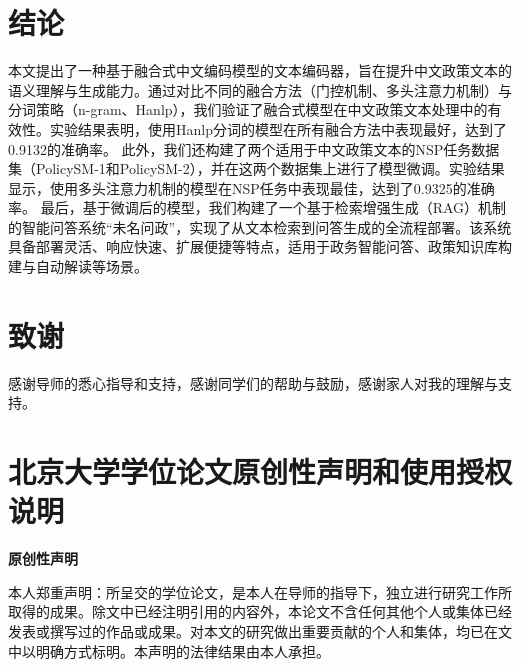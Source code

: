 \documentclass[12pt, a4paper]{ctexart}
\begin{document}
\section{结论}
本文提出了一种基于融合式中文编码模型的文本编码器，旨在提升中文政策文本的语义理解与生成能力。通过对比不同的融合方法（门控机制、多头注意力机制）与分词策略（n-gram、Hanlp），我们验证了融合式模型在中文政策文本处理中的有效性。实验结果表明，使用Hanlp分词的模型在所有融合方法中表现最好，达到了0.9132的准确率。
此外，我们还构建了两个适用于中文政策文本的NSP任务数据集（PolicySM-1和PolicySM-2），并在这两个数据集上进行了模型微调。实验结果显示，使用多头注意力机制的模型在NSP任务中表现最佳，达到了0.9325的准确率。
最后，基于微调后的模型，我们构建了一个基于检索增强生成（RAG）机制的智能问答系统“未名问政”，实现了从文本检索到问答生成的全流程部署。该系统具备部署灵活、响应快速、扩展便捷等特点，适用于政务智能问答、政策知识库构建与自动解读等场景。





\newpage
\section{致谢}

感谢导师的悉心指导和支持，感谢同学们的帮助与鼓励，感谢家人对我的理解与支持。

\newpage
\section{北京大学学位论文原创性声明和使用授权说明}

\vspace{1em} %

\begin{center}
    \textbf{原创性声明}
\end{center}

\vspace{1em} %

本人郑重声明：所呈交的学位论文，是本人在导师的指导下，独立进行研究工作所取得的成果。除文中已经注明引用的内容外，本论文不含任何其他个人或集体已经发表或撰写过的作品或成果。对本文的研究做出重要贡献的个人和集体，均已在文中以明确方式标明。本声明的法律结果由本人承担。

\vspace{4em} %
\end{document}
